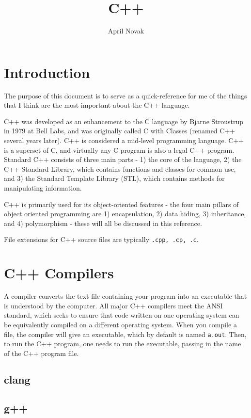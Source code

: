 \documentclass[10pt]{article}
\title{C++}
\author{April Novak}
\begin{document}
\maketitle
\section{Introduction}

The purpose of this document is to serve as a quick-reference for me of the things that I think are the most important about the C++ language.

C++ was developed as an enhancement to the C language by Bjarne Stroustrup in 1979 at Bell Labs, and was originally called C with Classes (renamed C++ several years later). C++ is considered a mid-level programming language. C++ is a superset of C, and virtually any C program is also a legal C++ program. Standard C++ consists of three main parts - 1) the core of the language, 2) the C++ Standard Library, which contains functions and classes for common use, and 3) the Standard Template Library (STL), which contains methods for manipulating information.

C++ is primarily used for its object-oriented features - the four main pillars of object oriented programming are 1) encapsulation, 2) data hiding, 3) inheritance, and 4) polymorphism - these will all be discussed in this reference.

File extensions for C++ source files are typically \texttt{.cpp, .cp, .c}.

\section{C++ Compilers}

A compiler converts the text file containing your program into an executable that is understood by the computer. All major C++ compilers meet the ANSI standard, which seeks to ensure that code written on one operating system can be equivalently compiled on a different operating system. When you compile a file, the compiler will give an executable, which by default is named \texttt{a.out}. Then, to run the C++ program, one needs to run the executable, passing in the name of the C++ program file. 

\subsection{clang}

\subsection{g++}
\end{document}
